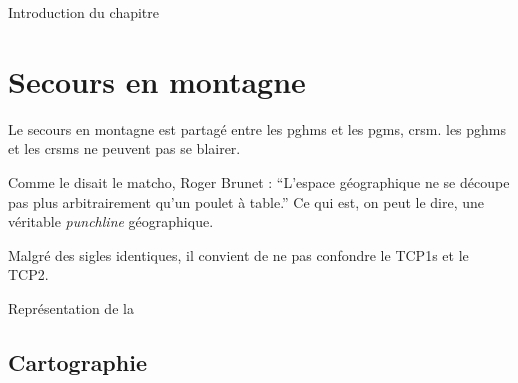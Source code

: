 %

\chaptertoc{}


Introduction du chapitre


\section{Secours en montagne}

Le secours en montagne est partagé entre les \glspl{pghm} et les \glspl{pgm},
\gls{crsm}. les \glspl{pghm} et les \glspl{crsm} ne peuvent pas se blairer.

Comme le disait le matcho, Roger Brunet : \enquote{L'espace
  géographique ne se découpe pas plus arbitrairement qu'un poulet à
  table.} Ce qui est, on peut le dire, une véritable \emph{punchline}
géographique.

Malgré des sigles identiques, il convient de ne pas confondre le
\glspl{TCP1} et le \gls{TCP2}.

\begin{carte}
  \begin{center}
    
  \end{center}
  \caption{Représentation de la}
  \label{fig:1}
\end{carte}

\subsection{Cartographie}

\blindtext

